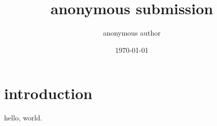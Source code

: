 \documentclass[twocolumn]{article}
\title{anonymous submission}
\author{anonymous author}
\date{\today}
\begin{document}
\maketitle
\section{introduction}
hello, world\cite{greenwade93}.



\end{document}
